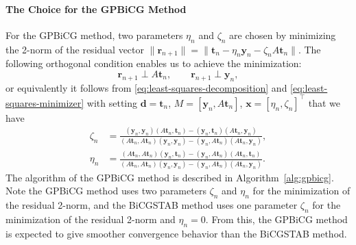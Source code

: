 \paragraph{{The Choice for the GPBiCG Method}}\label{subsec:gpbicg-parameter-choice}\mbox{}\par
{For the GPBiCG method, two parameters $\eta_n$ and $\zeta_n$ are chosen by minimizing the 2-norm of the residual vector $\|\bm r_{n+1}\|=\|\bm t_n-\eta_n\bm y_n-\zeta_nA\bm t_n\|$. The following orthogonal condition enables us to achieve the minimization:}
\[\bm r_{n+1}\perp A\bm t_n,\qquad\bm r_{n+1}\perp\bm y_n,\]
{or equivalently it follows from \eqref{eq:least-squares-decomposition} and \eqref{eq:least-squares-minimizer} with setting $\bm d=\bm t_n$, $M=[\bm y_n,A\bm t_n]$, $\bm x=[\eta_n,\zeta_n]^{\top}$ that we have}
\[\begin{aligned}\zeta_n&=\frac{(\bm y_n,\bm y_n)(A\bm t_n,\bm t_n)-(\bm y_n,\bm t_n)(A\bm t_n,\bm y_n)}{(A\bm t_n,A\bm t_n)(\bm y_n,\bm y_n)-(\bm y_n,A\bm t_n)(A\bm t_n,\bm y_n)},\\\eta_n&=\frac{(A\bm t_n,A\bm t_n)(\bm y_n,\bm t_n)-(\bm y_n,A\bm t_n)(A\bm t_n,\bm t_n)}{(A\bm t_n,A\bm t_n)(\bm y_n,\bm y_n)-(\bm y_n,A\bm t_n)(A\bm t_n,\bm y_n)}.\end{aligned}\]
{The algorithm of the GPBiCG method is described in Algorithm\ \ref{alg:gpbicg}. Note the GPBiCG method uses two parameters $\zeta_n$ and $\eta_n$ for the minimization of the residual 2-norm, and the BiCGSTAB method uses one parameter $\zeta_n$ for the minimization of the residual 2-norm and $\eta_n=0$. From this, the GPBiCG method is expected to give smoother convergence behavior than the BiCGSTAB method.}
